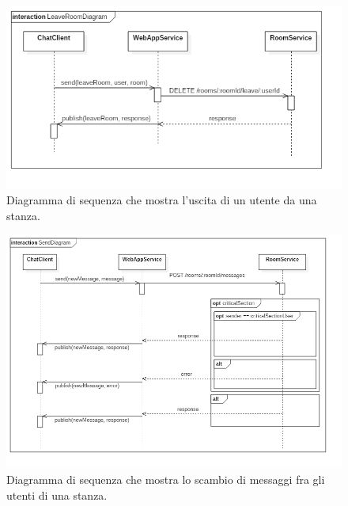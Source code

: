 \documentclass[a4paper]{article}
\begin{document}
\begin{figure}[H]
	\centering
	\includegraphics[width=\linewidth, height=\textheight, keepaspectratio]{res/LeaveRoomDiagram.png}
	\caption{Diagramma di sequenza che mostra l'uscita di un utente da una stanza.}
	\label{fig:leave-diagram}
\end{figure}

\begin{figure}[H]
    \centering
    \includegraphics[width=\linewidth, height=\textheight, keepaspectratio]{res/SendDiagram.png}
        \caption{Diagramma di sequenza che mostra lo scambio di messaggi fra gli utenti di una stanza.}
    \label{fig:messages-diagram}
\end{figure}
\end{document}
